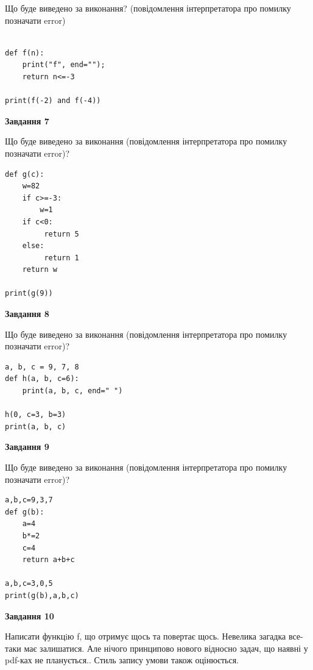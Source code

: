 \documentclass[12pt, ukrainian]{article}
\begin{document}
{\begin {large}
Що буде виведено за виконання? (повідомлення інтерпретатора про помилку позначати error)\par
\begin{verbatim}

def f(n):
    print("f", end="");
    return n<=-3

print(f(-2) and f(-4))
\end{verbatim}

{\begin {center}\textbf{Завдання 7}\end {center}}

Що буде виведено за виконання (повідомлення інтерпретатора про помилку позначати error)?\par
\begin{verbatim}
def g(c):
    w=82
    if c>=-3: 
        w=1
    if c<0:
         return 5
    else:
         return 1
    return w

print(g(9))
\end{verbatim}

{\begin {center}\textbf{Завдання 8}\end {center}}

Що буде виведено за виконання (повідомлення інтерпретатора про помилку позначати error)?\par
\begin{verbatim}
a, b, c = 9, 7, 8
def h(a, b, c=6):
    print(a, b, c, end=" ")

h(0, c=3, b=3)
print(a, b, c)
\end{verbatim}

{\begin {center}\textbf{Завдання 9}\end {center}}

Що буде виведено за виконання (повідомлення інтерпретатора про помилку позначати error)?\par
\begin{verbatim}
a,b,c=9,3,7
def g(b):
    a=4
    b*=2
    c=4
    return a+b+c

a,b,c=3,0,5
print(g(b),a,b,c)
\end{verbatim}

{\begin {center}\textbf{Завдання 10}\end {center}}


Написати функцiю f, що отримує щось та повертає щось. Невелика загадка все-таки має залишатися. Але нічого принципово нового відносно задач, що наявні у pdf-ках не планується.. Стиль запису умови також оцінюється.\par
\end {large}}
\newpage
\end{document}
